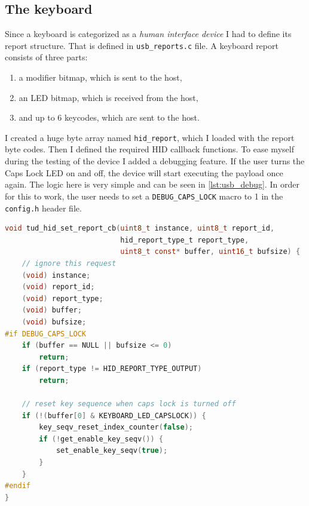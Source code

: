 \subsection{The keyboard}
Since a keyboard is categorized as a \emph{human interface device} I had to define its report structure. That is defined in \verb|usb_reports.c| file. A keyboard report consists of three parts:
\begin{enumerate}
    \item a modifier bitmap, which is sent to the host,
    \item an LED bitmap, which is received from the host,
    \item and up to 6 keycodes, which are sent to the host.
\end{enumerate}
I created a huge byte array named \verb|hid_report|, which I loaded with the report byte codes. Then I defined the required HID callback functions. To ease myself during the testing of the device I added a debugging feature. If the user turns the Caps Lock LED on and off, the device will start executing the payload once again. The logic here is very simple and can be seen in \autoref{lst:usb_debug}. In order for this to work, the user needs to set a \verb|DEBUG_CAPS_LOCK| macro to 1 in the \verb|config.h| header file.

\begin{lstlisting}[caption={A snippet of code which implements the payload re-execution.},
                   label={lst:usb_debug},
                   language=c]
void tud_hid_set_report_cb(uint8_t instance, uint8_t report_id,
                           hid_report_type_t report_type,
                           uint8_t const* buffer, uint16_t bufsize) {
    // ignore this request
    (void) instance;
    (void) report_id;
    (void) report_type;
    (void) buffer;
    (void) bufsize;
#if DEBUG_CAPS_LOCK
    if (buffer == NULL || bufsize <= 0)
        return;
    if (report_type != HID_REPORT_TYPE_OUTPUT)
        return;

    // reset key sequence when caps lock is turned off
    if (!(buffer[0] & KEYBOARD_LED_CAPSLOCK)) {
        key_seqv_reset_index_counter(false);
        if (!get_enable_key_seqv()) {
            set_enable_key_seqv(true);
        }
    }
#endif
}
\end{lstlisting}

